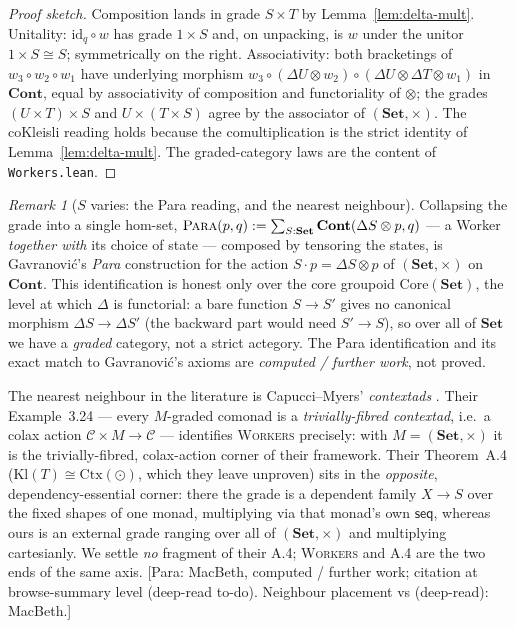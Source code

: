 \documentclass[11pt,a4paper]{book}
\newcommand{\Set}{\mathbf{Set}}
\newcommand{\Cont}{\mathbf{Cont}}
\newcommand{\id}{\mathrm{id}}
\newcommand{\Workers}{\textup{\textsc{Workers}}}
\theoremstyle{plain}
\theoremstyle{definition}
\theoremstyle{remark}
\newtheorem{Remark}[Theorem]{Remark}
\newcommand{\prov}[1]{\hfill\textsf{\footnotesize[#1]}}
\begin{document}
\begin{proof}[Proof sketch]
Composition lands in grade $S\times T$ by Lemma~\ref{lem:delta-mult}. Unitality: $\id_{q}\circ w$ has grade
$1\times S$ and, on unpacking, is $w$ under the unitor $1\times S\cong S$; symmetrically on the right.
Associativity: both bracketings of $w_3\circ w_2\circ w_1$ have underlying morphism
$w_3\circ(\Delta U\otimes w_2)\circ(\Delta U\otimes\Delta T\otimes w_1)$ in $\Cont$, equal by associativity of
composition and functoriality of $\otimes$; the grades $(U\times T)\times S$ and $U\times(T\times S)$ agree
by the associator of $(\Set,\times)$. The coKleisli reading holds because the comultiplication is the strict
identity of Lemma~\ref{lem:delta-mult}. The graded-category laws are the content of \texttt{Workers.lean}.
\end{proof}

\begin{Remark}[$S$ varies: the Para reading, and the nearest neighbour]\label{rem:workers-para}
Collapsing the grade into a single hom-set, $\textsc{Para}(p,q):=\sum_{S:\Set}\Cont(\Delta S\otimes p,q)$
--- a Worker \emph{together with} its choice of state --- composed by tensoring the states, is
Gavranovi\'c's \emph{Para} construction \cite{Gavranovic} for the action $S\cdot p=\Delta S\otimes p$ of
$(\Set,\times)$ on $\Cont$. This identification is honest only over the core groupoid $\mathrm{Core}(\Set)$,
the level at which $\Delta$ is functorial: a bare function $S\to S'$ gives no canonical morphism
$\Delta S\to\Delta S'$ (the backward part would need $S'\to S$), so over all of $\Set$ we have a
\emph{graded} category, not a strict actegory. The Para identification and its exact match to Gavranovi\'c's
axioms are \emph{computed / further work}, not proved.

The nearest neighbour in the literature is Capucci--Myers' \emph{contextads} \cite{CapucciMyers}. Their
Example~3.24 --- every $M$-graded comonad is a \emph{trivially-fibred contextad}, i.e.\ a colax action
$\mathcal C\times M\to\mathcal C$ --- identifies \Workers{} precisely: with $M=(\Set,\times)$ it is the
trivially-fibred, colax-action corner of their framework. Their Theorem~A.4 ($\mathrm{Kl}(T)\cong\mathrm{Ctx}(\odot)$,
which they leave unproven) sits in the \emph{opposite}, dependency-essential corner: there the grade is a
dependent family $X\to S$ over the fixed shapes of one monad, multiplying via that monad's own $\mathsf{seq}$,
whereas ours is an external grade ranging over all of $(\Set,\times)$ and multiplying cartesianly. We settle
\emph{no} fragment of their A.4; \Workers{} and A.4 are the two ends of the same axis.
\prov{Para: MacBeth, computed / further work; citation \cite{Gavranovic} at browse-summary level
(deep-read to-do). Neighbour placement vs \cite{CapucciMyers} (deep-read): MacBeth.}
\end{Remark}
\end{document}
